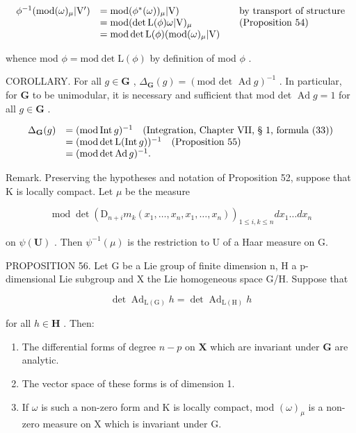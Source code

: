 \[
\begin{array}{r l r l} \phi^ {- 1} (\mathrm{mod} (\omega) _ {\mu}   |   \mathrm{V} ^ {\prime}) & = \mathrm{mod} (\phi^ {*} (\omega)) _ {\mu}   |   \mathrm{V}) & & \text {by transport of structure} \\ & = \mathrm{mod} (\det \mathrm{L} (\phi) \omega   |   \mathrm{V}) _ {\mu} & & \text {(Proposition 54)} \\ & = \mathrm{mod} \det \mathrm{L} (\phi) (\mathrm{mod} (\omega) _ {\mu}   |   \mathrm{V}) \end{array}
\]

whence mod \(\phi = \mathrm{mod}\det \mathrm{L}(\phi)\) by definition of mod \(\phi\) .

COROLLARY. For all \(g \in \mathbf{G}\) , \(\Delta_{\mathbf{G}}(g) = (\text{mod det } \operatorname{Ad} g)^{-1}\) . In particular, for \(\mathbf{G}\) to be unimodular, it is necessary and sufficient that mod det \(\operatorname{Ad} g = 1\) for all \(g \in \mathbf{G}\) .

\[
\begin{array}{r l} \Delta_ {\mathbf {G}} (g) & = (\text {mod} \operatorname{Int} g) ^ {- 1} \quad \text {(Integration, Chapter VII, § 1, formula (33))} \\ & = (\text {mod} \det \operatorname{L} (\operatorname{Int} g)) ^ {- 1} \quad \text {(Proposition 55)} \\ & = (\text {mod} \det \operatorname{Ad} g) ^ {- 1}. \end{array}
\]

Remark. Preserving the hypotheses and notation of Proposition 52, suppose that K is locally compact. Let \(\mu\) be the measure

\[
\operatorname{mod} \det (\mathrm{D} _ {n + i} m _ {k} (x _ {1}, \dots , x _ {n}, x _ {1}, \dots , x _ {n})) _ {1 \leqslant i, k \leqslant n} d x _ {1} \dots d x _ {n}
\]

on \(\psi (\mathbf{U})\) . Then \(\psi^{-1}(\mu)\) is the restriction to U of a Haar measure on G.

PROPOSITION 56. Let G be a Lie group of finite dimension n, H a p-dimensional Lie subgroup and X the Lie homogeneous space G/H. Suppose that

\[
\det \operatorname{Ad} _ {\mathrm{L} (\mathrm{G})} h = \det \operatorname{Ad} _ {\mathrm{L} (\mathrm{H})} h
\]

for all \(h\in \mathbf{H}\) . Then:

\begin{enumerate}
\def\labelenumi{(\roman{enumi})}
\item
  The differential forms of degree \(n - p\) on \(\mathbf{X}\) which are invariant under \(\mathbf{G}\) are analytic.
\item
  The vector space of these forms is of dimension 1.
\item
  If \(\omega\) is such a non-zero form and K is locally compact, mod \((\omega)_{\mu}\) is a non-zero measure on X which is invariant under G.
\end{enumerate}

